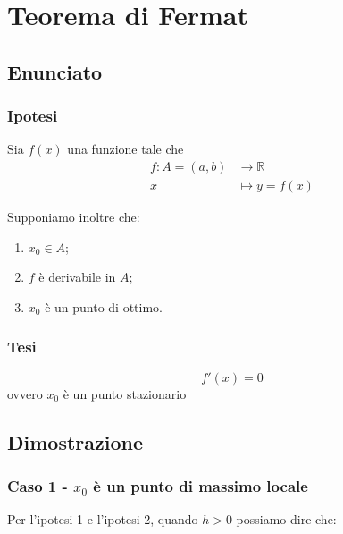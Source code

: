 \documentclass[../dimostrazioni]{subfiles}
\begin{document}
    \chapter{Teorema di Fermat}

        \section*{Enunciato}

        \subsection*{Ipotesi}

            Sia \(f(x)\) una funzione tale che
            \begin{align*}
                f : A = (a, b) &\longrightarrow \mathbb{R}\\
                x &\longmapsto y = f(x) 
            \end{align*}

            Supponiamo inoltre che:

            \begin{enumerate}
                \indentitem \item \(x_0 \in A\);
                \indentitem \item \(f\) è derivabile in \(A\);
                \indentitem \item \(x_0\) è un punto di ottimo.
            \end{enumerate}

        \subsection*{Tesi}

            \[f'(x) = 0\] ovvero \(x_0\) è un punto stazionario

        \section*{Dimostrazione}

            \medskip

            \subsection{Caso 1 - \(x_0\) è un punto di massimo locale}

            Per l'ipotesi 1 e l'ipotesi 2, quando \(h>0\) possiamo dire che:
            
\end{document}
